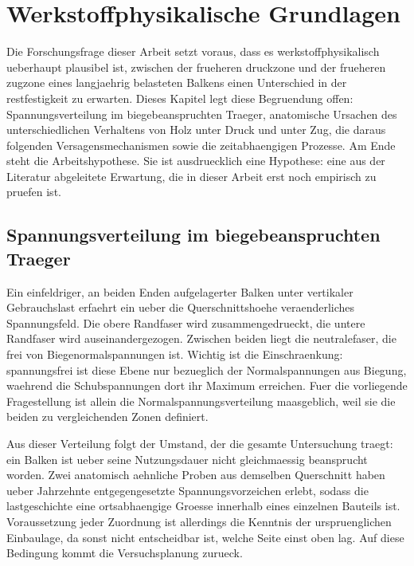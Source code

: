 \chapter{Werkstoffphysikalische Grundlagen}
\label{ch:data}

Die Forschungsfrage dieser Arbeit setzt voraus, dass es werkstoffphysikalisch
ueberhaupt plausibel ist, zwischen der frueheren \gls{druckzone} und der
frueheren \gls{zugzone} eines langjaehrig belasteten Balkens einen Unterschied
in der \gls{restfestigkeit} zu erwarten. Dieses Kapitel legt diese Begruendung
offen: Spannungsverteilung im biegebeanspruchten Traeger, anatomische Ursachen
des unterschiedlichen Verhaltens von Holz unter Druck und unter Zug, die daraus
folgenden Versagensmechanismen sowie die zeitabhaengigen Prozesse. Am Ende steht
die Arbeitshypothese. Sie ist ausdruecklich eine Hypothese: eine aus der Literatur
abgeleitete Erwartung, die in dieser Arbeit erst noch empirisch zu pruefen ist.

\section{Spannungsverteilung im biegebeanspruchten Traeger}
\label{sec:spannungsverteilung}

Ein einfeldriger, an beiden Enden aufgelagerter Balken unter vertikaler
Gebrauchslast erfaehrt ein ueber die Querschnittshoehe veraenderliches
Spannungsfeld. Die obere Randfaser wird zusammengedrueckt, die untere Randfaser
wird auseinandergezogen. Zwischen beiden liegt die \gls{neutralefaser}, die frei
von Biegenormalspannungen ist. Wichtig ist die Einschraenkung: spannungsfrei ist
diese Ebene nur bezueglich der Normalspannungen aus Biegung, waehrend die
Schubspannungen dort ihr Maximum erreichen. Fuer die vorliegende Fragestellung
ist allein die Normalspannungsverteilung maasgeblich, weil sie die beiden zu
vergleichenden Zonen definiert.

Aus dieser Verteilung folgt der Umstand, der die gesamte Untersuchung traegt:
ein Balken ist ueber seine Nutzungsdauer nicht gleichmaessig beansprucht worden.
Zwei anatomisch aehnliche Proben aus demselben Querschnitt haben ueber
Jahrzehnte entgegengesetzte Spannungsvorzeichen erlebt, sodass die
\gls{lastgeschichte} eine ortsabhaengige Groesse innerhalb eines einzelnen
Bauteils ist. Voraussetzung jeder Zuordnung ist allerdings die Kenntnis der
urspruenglichen Einbaulage, da sonst nicht entscheidbar ist, welche Seite einst
oben lag. Auf diese Bedingung kommt die Versuchsplanung zurueck.

